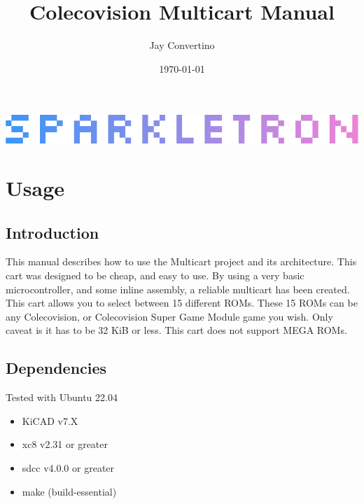 \documentclass{article}
\title{{\Huge Colecovision Multicart Manual}}
\author{\Large Jay Convertino}
\date{\today}
\begin{document}
  \begin{titlepage}
    \begin{center}

    \thetitle

    \vspace{25mm}

    \includegraphics[width=\textwidth,height=\textheight,keepaspectratio]{src/img/SPARKLETRON.png}

    \vspace{25mm}

    \thedate

    \vspace{15mm}

    \theauthor

    \end{center}
  \end{titlepage}

  \tableofcontents

  \newpage

  \section{Usage}

  \subsection{Introduction}

  \par
  This manual describes how to use the Multicart project and its architecture. This cart was designed to be cheap, and easy to use.
  By using a very basic microcontroller, and some inline assembly, a reliable multicart has been created. This cart allows you to
  select between 15 different ROMs. These 15 ROMs can be any Colecovision, or Colecovision Super Game Module game you wish. Only
  caveat is it has to be 32 KiB or less. This cart does not support MEGA ROMs.

  \subsection{Dependencies}

  \par
  Tested with Ubuntu 22.04

  \begin{itemize}
    \item KiCAD v7.X
    \item xc8 v2.31 or greater
    \item sdcc v4.0.0 or greater
    \item make (build-essential)
  \end{itemize}
\end{document}
